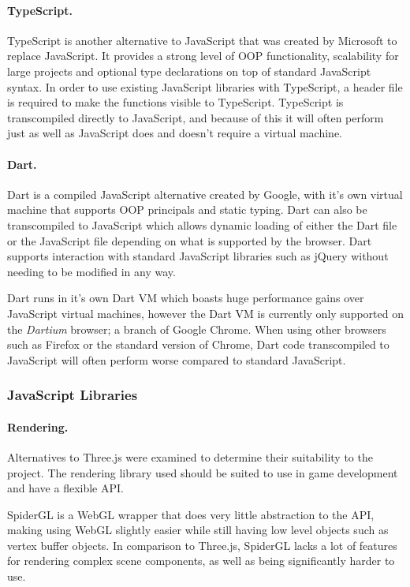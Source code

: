 \documentclass[a4paper, 12pt]{article}
\begin{document}
\paragraph{TypeScript.}
TypeScript is another alternative to JavaScript that was created by Microsoft to replace JavaScript. It provides a strong level of OOP functionality, scalability for large projects and optional type declarations on top of standard JavaScript syntax.\cite{typescript} In order to use existing JavaScript libraries with TypeScript, a header file is required to make the functions visible to TypeScript. TypeScript is transcompiled directly to JavaScript, and because of this it will often perform just as well as JavaScript does and doesn't require a virtual machine.

\paragraph{Dart.}
Dart is a compiled JavaScript alternative created by Google, with it's own virtual machine that supports OOP principals and static typing. Dart can also be transcompiled to JavaScript which allows dynamic loading of either the Dart file or the JavaScript file depending on what is supported by the browser.\cite{dart} Dart supports interaction with standard JavaScript libraries such as jQuery without needing to be modified in any way.

Dart runs in it's own Dart VM which boasts huge performance gains over JavaScript virtual machines, however the Dart VM is currently only supported on the \emph{Dartium} browser; a branch of Google Chrome. When using other browsers such as Firefox or the standard version of Chrome, Dart code transcompiled to JavaScript will often perform worse compared to standard JavaScript.\cite{dartperformance}

\subsubsection{JavaScript Libraries}

\paragraph{Rendering.}
Alternatives to Three.js were examined to determine their suitability to the project. The rendering library used should be suited to use in game development and have a flexible API.

SpiderGL is a WebGL wrapper that does very little abstraction to the API, making using WebGL slightly easier while still having low level objects such as vertex buffer objects.\cite{spidergl} In comparison to Three.js, SpiderGL lacks a lot of features for rendering complex scene components, as well as being significantly harder to use.
\end{document}
